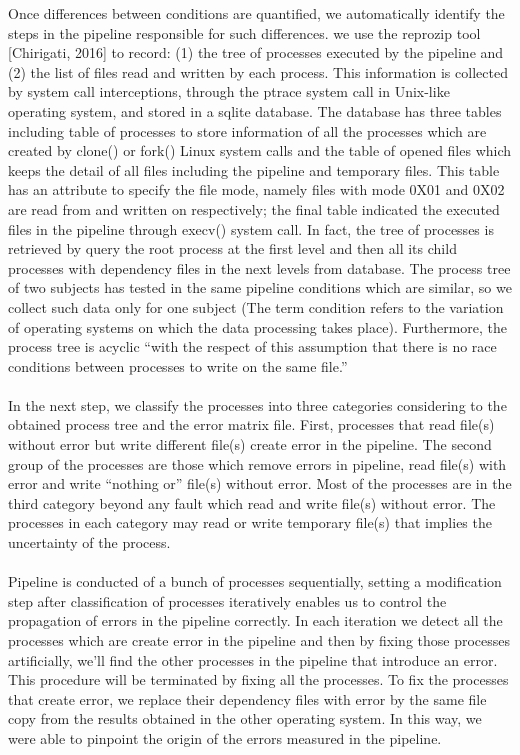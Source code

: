 \documentclass{article}
\begin{document}
Once differences between conditions are quantified, we automatically identify the steps in the pipeline responsible for such differences.
 we use the reprozip tool [Chirigati, 2016] to record: (1) the tree of processes executed by the pipeline and
 (2) the list of files read and written by each process. This information is collected by system call interceptions, 
through the ptrace system call in Unix-like operating system, and stored in a sqlite database. The database has three 
tables including table of processes to store information of all the processes which are created by clone() 
or fork() Linux system calls and the table of opened files which keeps the detail of all files including the pipeline 
and temporary files. This table has an attribute to specify the file mode, namely files with mode 0X01 and 0X02 are read 
from and written on respectively; the final table indicated the executed files in the pipeline through execv() system call.
 In fact, the tree of processes is retrieved by query the root process at the first level and then all its child processes with 
dependency files in the next levels from database. The process tree of two subjects has tested in the same pipeline conditions
 which are similar, so we collect such data only for one subject (The term condition refers to the variation of operating systems
 on which the data processing takes place). Furthermore, the process tree is acyclic “with the respect of this assumption that 
there is no race conditions between processes to write on the same file.”
\paragraph{} In the next step, we classify the processes into three categories considering to the obtained process tree 
and the error matrix file. First, processes that read file(s) without error but write different file(s) create error in 
the pipeline. The second group of the processes are those which remove errors in pipeline, read file(s) with error and
 write “nothing or” file(s) without error. Most of the processes are in the third category beyond any fault which
 read and write file(s) without error. The processes in each category may read or write temporary file(s) that implies 
the uncertainty of the process.
\paragraph{} Pipeline is conducted of a bunch of processes sequentially, setting a modification step after classification
 of processes iteratively enables us to control the propagation of errors in the pipeline correctly. In each iteration
 we detect all the processes which are create error in the pipeline and then by fixing those processes artificially, 
we’ll find the other processes in the pipeline that introduce an error. This procedure will be terminated by fixing all the processes. 
To fix the processes that create error, we replace their dependency files with error by the same file copy from the results 
obtained in the other operating system. In this way, we were able to pinpoint the origin of the errors measured in the pipeline.
\end{document}
